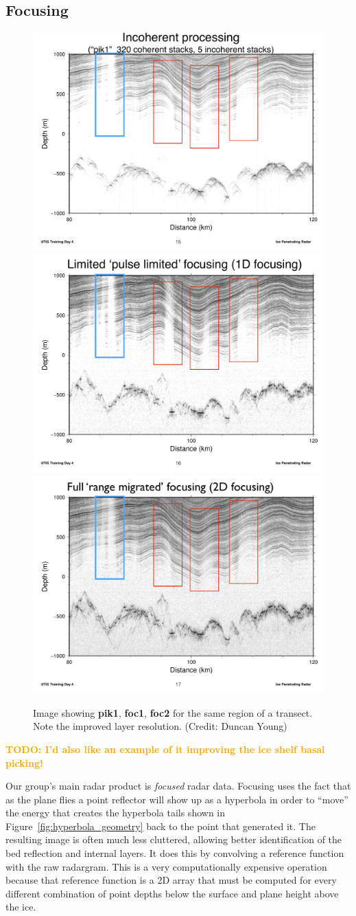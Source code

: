 \documentclass[11pt]{article}
\newcommand{\future}[1]{\ifthenelse{\boolean{include-future}} {\textcolor{Orange}{\textbf{TODO: #1}}}{}}
\newcommand{\figref}[1]{Figure~\ref{#1}}
\begin{document}
\subsection{Focusing}
\label{sec:focusing}

\begin{figure}[ht!]
\centering
\includegraphics[width=0.325\columnwidth]{figures/DAY_pik1.pdf}
\includegraphics[width=0.325\columnwidth]{figures/DAY_foc1.pdf}
\includegraphics[width=0.325\columnwidth]{figures/DAY_foc2.pdf}
\caption[]{Image showing \textbf{pik1}, \textbf{foc1}, \textbf{foc2} for the same region of a transect. Note the improved layer resolution. (Credit: Duncan Young)}
\end{figure}
\future{I'd also like an example of it improving the ice shelf basal picking!}

Our group's main radar product is \emph{focused} radar data. Focusing uses the fact that as the plane flies a point reflector will show up as a hyperbola in order to ``move'' the energy that creates the hyperbola tails shown in \figref{fig:hyperbola_geometry} back to the point that generated it. The resulting image is often much less cluttered, allowing better identification of the bed reflection and internal layers. It does this by convolving a reference function with the raw radargram. This is a very computationally expensive operation because that reference function is a 2D array that must be computed for every different combination of point depths below the surface and plane height above the ice. 
\end{document}
